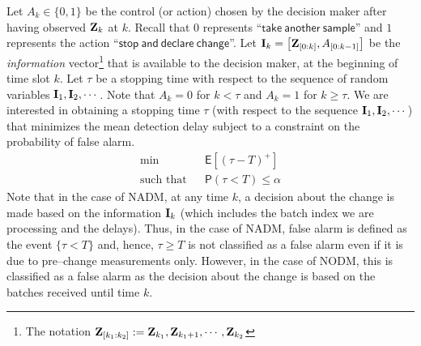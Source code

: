 \documentclass[acmtosn]{acmtrans2m}
\newcommand{\prob}[1]{\mathsf{P}\left(#1\right)}
\newcommand{\EXP}[1]{\mathsf{E}\!\left[#1\right]}
\begin{document}
Let $A_k \in \{0,1\}$ be the control 
(or action) chosen by the decision maker after having observed ${\bf Z}_k$ 
at $k$. Recall that $0$ represents ``$\mathsf{take~another~sample}$'' and $1$ 
represents the action ``$\mathsf{stop~and~declare~change}$''. 
Let ${\bf I}_k = 
\left[{\bf Z}_{[0:k]},A_{[0:k-1]}\right]$ be the {\em information} 
vector\footnote{The notation ${\bf Z}_{[k_1:k_2]} := 
{\bf Z}_{k_1},{\bf Z}_{k_1+1},\cdots,{\bf Z}_{k_2}$} 
that is available to the decision maker, at the beginning of time slot $k$. 
Let $\tau$ be a stopping time with respect to the sequence of random variables 
${\bf I}_1, {\bf I}_2, \cdots$. 
Note that $A_k = 0$ for $k < \tau$ and $A_k = 1$ for $k \geqslant \tau$.
We are interested in obtaining a stopping time $\tau$ (with respect to
the sequence ${\bf I}_1,{\bf I}_2,\cdots$) that 
minimizes the mean detection delay subject to a constraint on the probability 
of false alarm. 
\begin{eqnarray}
 \min & & \EXP{(\tau -T)^+} \\
\text{such that}& & \prob{\tau < T} \leqslant \alpha \nonumber
\label{eqn:na-cdp}
\end{eqnarray}
Note that in the case of NADM, at any time $k$, a decision about the 
change is made based on the information ${\bf I}_k$ (which includes the
batch index we are processing and the delays). Thus, in the case of {\sf
NADM}, false alarm is defined as the event $\{\tau < T\}$ and, hence,
$\tau \geqslant T$ is not classified as a false alarm even if it is due to
pre--change measurements only. However, in the case of {\sf NODM},
this is classified as a false alarm as the
decision about the change is based on the batches received
until time $k$. 
\end{document}
